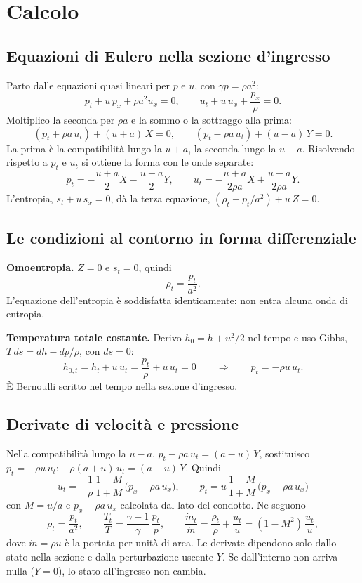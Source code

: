 \documentclass[11pt,a4paper]{article}
\newcommand{\uma}{u-a}
\newcommand{\upa}{u+a}
\begin{document}
\section{Calcolo}
\subsection{Equazioni di Eulero nella sezione d'ingresso}
Parto dalle equazioni quasi lineari per $p$ e $u$, con $\gamma p=\rho a^2$:
\[
  p_t+u\,p_x+\rho a^2u_x=0,\qquad u_t+u\,u_x+\frac{p_x}{\rho}=0 .
\]
Moltiplico la seconda per $\rho a$ e la sommo o la sottraggo alla prima:
\[
  (p_t+\rho a\,u_t)+(u+a)\,X=0,\qquad (p_t-\rho a\,u_t)+(u-a)\,Y=0 .
\]
La prima è la compatibilità lungo la $\upa$, la seconda lungo la $\uma$. Risolvendo rispetto a $p_t$ e $u_t$ si
ottiene la forma con le onde separate:
\[
  p_t=-\frac{u+a}{2}X-\frac{u-a}{2}Y,\qquad u_t=-\frac{u+a}{2\rho a}X+\frac{u-a}{2\rho a}Y .
\]
L'entropia, $s_t+u\,s_x=0$, dà la terza equazione, $(\rho_t-p_t/a^2)+u\,Z=0$.

\subsection{Le condizioni al contorno in forma differenziale}
\textbf{Omoentropia.} $Z=0$ e $s_t=0$, quindi
\[
  \rho_t=\frac{p_t}{a^2}.
\]
L'equazione dell'entropia è soddisfatta identicamente: non entra alcuna onda di entropia.

\textbf{Temperatura totale costante.} Derivo $h_0=h+u^2/2$ nel tempo e uso Gibbs, $T\,ds=dh-dp/\rho$, con $ds=0$:
\[
  h_{0,t}=h_t+u\,u_t=\frac{p_t}{\rho}+u\,u_t=0\qquad\Longrightarrow\qquad p_t=-\rho u\,u_t .
\]
È Bernoulli scritto nel tempo nella sezione d'ingresso.

\subsection{Derivate di velocità e pressione}
Nella compatibilità lungo la $\uma$, $p_t-\rho a\,u_t=(a-u)\,Y$, sostituisco $p_t=-\rho u\,u_t$:
$-\rho(a+u)\,u_t=(a-u)\,Y$. Quindi
\[
  \boxed{\;u_t=-\frac{1}{\rho}\,\frac{1-M}{1+M}\,\bigl(p_x-\rho a\,u_x\bigr),\qquad
  p_t=u\,\frac{1-M}{1+M}\,\bigl(p_x-\rho a\,u_x\bigr)\;}
\]
con $M=u/a$ e $p_x-\rho a\,u_x$ calcolata dal lato del condotto. Ne seguono
\[
  \rho_t=\frac{p_t}{a^2},\qquad \frac{T_t}{T}=\frac{\gamma-1}{\gamma}\,\frac{p_t}{p},\qquad
  \frac{\dot m_t}{\dot m}=\frac{\rho_t}{\rho}+\frac{u_t}{u}=(1-M^2)\,\frac{u_t}{u},
\]
dove $\dot m=\rho u$ è la portata per unità di area. Le derivate dipendono solo dallo stato nella sezione e dalla
perturbazione uscente $Y$. Se dall'interno non arriva nulla ($Y=0$), lo stato all'ingresso non cambia.
\end{document}
